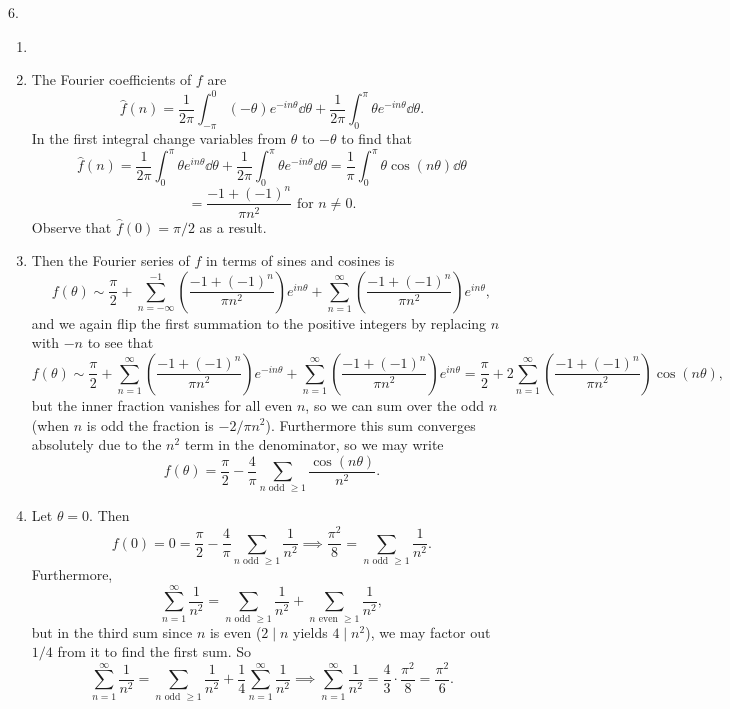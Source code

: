 \documentclass[11pt]{article}
\newcommand{\br}[1]{\left(#1\right)}
\begin{document}
6. \begin{enumerate}[label=(\alph*)]
    \item 
    \item \vspace*{5cm} The Fourier coefficients of $f$ are \[\hat{f}(n) = \frac{1}{2\pi}\int_{-\pi}^{0} (-\theta) e^{-in\theta}\dd{\theta} + \frac{1}{2\pi}\int_{0}^{\pi} \theta e^{-in\theta}\dd{\theta}.\] In the first integral change variables from $\theta$ to $-\theta$ to find that \[\hat{f}(n) = \frac{1}{2\pi}\int_{0}^{\pi} \theta e^{in\theta}\dd{\theta} + \frac{1}{2\pi}\int_{0}^{\pi} \theta e^{-in\theta}\dd{\theta} = \frac{1}{\pi}\int_0^{\pi}\theta\cos(n\theta)\dd{\theta}\] \[ = \frac{-1+(-1)^n}{\pi n^2}\text{ for } n \neq 0.\] Observe that $\hat{f}(0) = \pi/2$ as a result.
    \item Then the Fourier series of $f$ in terms of sines and cosines is \[f(\theta)\sim \frac{\pi}{2} + \sum_{n=-\infty}^{-1} \br{\frac{-1+(-1)^n}{\pi n^2}}e^{in\theta} + \sum_{n=1}^{\infty} \br{\frac{-1+(-1)^n}{\pi n^2}}e^{in\theta}, \] and we again flip the first summation to the positive integers by replacing $n$ with $-n$ to see that \[f(\theta)\sim \frac{\pi}{2} + \sum_{n=1}^{\infty} \br{\frac{-1+(-1)^n}{\pi n^2}}e^{-in\theta} + \sum_{n=1}^{\infty} \br{\frac{-1+(-1)^n}{\pi n^2}}e^{in\theta} = \frac{\pi}{2} + 2\sum_{n=1}^{\infty}\br{\frac{-1+(-1)^n}{\pi n^2}}\cos(n\theta),\] but the inner fraction vanishes for all even $n$, so we can sum over the odd $n$ (when $n$ is odd the fraction is $-2/\pi n^2$). Furthermore this sum converges absolutely due to the $n^2$ term in the denominator, so we may write \[f(\theta) = \frac{\pi}{2} - \frac{4}{\pi}\sum_{n \text{ odd }\geq 1} \frac{\cos(n\theta)}{n^2}.\]
    \item Let $\theta =0$. Then \[f(0) = 0 = \frac{\pi}{2} - \frac{4}{\pi}\sum_{n \text{ odd }\geq 1} \frac{1}{n^2} \implies \frac{\pi^2}{8} = \sum_{n \text{ odd }\geq 1} \frac{1}{n^2}.\] Furthermore, \[\sum_{n=1}^{\infty} \frac{1}{n^2} = \sum_{n \text{ odd }\geq 1} \frac{1}{n^2} + \sum_{n \text{ even }\geq 1} \frac{1}{n^2},\] but in the third sum since $n$ is even ($2\mid n$ yields $4\mid n^2$), we may factor out $1/4$ from it to find the first sum. So \[\sum_{n=1}^{\infty} \frac{1}{n^2} = \sum_{n \text{ odd }\geq 1} \frac{1}{n^2} + \frac{1}{4}\sum_{n =1}^{\infty} \frac{1}{n^2} \implies \sum_{n=1}^{\infty} \frac{1}{n^2} = \frac{4}{3}\cdot\frac{\pi^2}{8} = \frac{\pi^2}{6}.\]
\end{enumerate}
\end{document}
